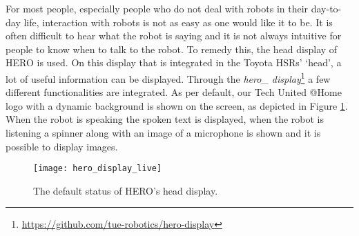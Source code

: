 \label{ssec:display}
For most people, especially people who do not deal with robots in their day-to-day life, interaction with robots is not as easy as one would like it to be. It is often difficult to hear what the robot is saying and it is not always intuitive for people to know when to talk to the robot. To remedy this, the head display of HERO is used. On this display that is integrated in the Toyota HSRs' `head', a lot of useful information can be displayed. Through the \emph{hero\_ display}\footnote{\url{https://github.com/tue-robotics/hero-display}} a few different functionalities are integrated. As per default, our Tech United @Home logo with a dynamic background is shown on the screen, as depicted in Figure \ref{fig:hero_display}. When the robot is speaking the spoken text is displayed, when the robot is listening a spinner along with an image of a microphone is shown and it is possible to display images.
\begin{figure}[H]
    \centering
	\texttt{[image: hero\_display\_live]}
	\caption{
		The default status of HERO's head display.}
	\label{fig:hero_display}
\end{figure}